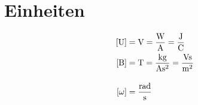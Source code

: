 \section{Einheiten}
\begin{align*}
\left[ \mathrm{U} \right] &= \mathrm{V} = \mathrm{\frac{W}{A}} = \mathrm{\frac{J}{C}}\\
\left[ \mathrm{B} \right] &= \mathrm{T} = \mathrm{\frac{kg}{As^2}} = \mathrm{\frac{Vs}{m^2}}\\[1em]
\left[ \mathrm{\omega} \right] &= \mathrm{\frac{rad}{s}}
\end{align*}